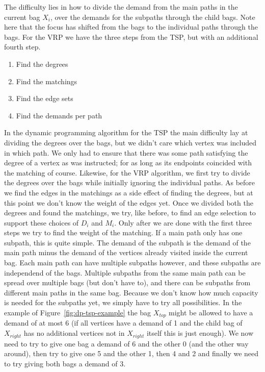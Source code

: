 \documentclass[12pt]{article}
\begin{document}
    The difficulty lies in how to divide the demand from the main paths in the current bag $X_i$,
    over the demands for the subpaths through the child bags. Note here that the focus has shifted
    from the bags to the individual paths through the bags. For the VRP we have the three steps from
    the TSP, but with an additional fourth step.
    \begin{enumerate}
        \item Find the degrees
        \item Find the matchings
        \item Find the edge sets
        \item Find the demands per path
    \end{enumerate}
    In the dynamic programming algorithm for the TSP the main difficulty lay at dividing the degrees
    over the bags, but we didn't care which vertex was included in which path. We only had to ensure
    that there was some path satisfying the degree of a vertex as was instructed; for as long as its
    endpoints coincided with the matching of course.
    Likewise, for the VRP algorithm, we first try to divide the degrees over the bags while initially
    ignoring the individual paths. As before we find the edges in the matchings as a side effect of
    finding the degrees, but at this point we don't know the weight of the edges yet. Once we
    divided both the degrees and found the matchings, we try, like before, to find an edge selection
    to support these choices of $D_i$ and $M_i$.
    Only after we are done with the first three steps we try to find the weight of the matching. If a
    main path only has one subpath, this is quite simple. The demand of the subpath is the demand of
    the main path minus the demand of the vertices already visited inside the current bag.
    Each main path can have multiple subpaths however, and these subpaths are independend of the
    bags. Multiple subpaths from the same main path can be spread over multiple bags (but don't have
    to), and there can be subpaths from different main paths in the same bag.
    Because we don't know how much capacity is needed for the subpaths yet, we simply have to try
    all possibilities. In the example of Figure~\ref{fig:dp-tsp-example} the bag $X_{top}$ might
    be allowed to have a demand of at most 6 (if all vertices have a demand of 1 and the child bag
    of $X_{right}$ has no additional vertices not in $X_{right}$ itself this is just enough). We now
    need to try to give one bag a demand of 6 and the other 0 (and the other way around), then try
    to give one 5 and the other 1, then 4 and 2 and finally we need to try giving both bags a demand
    of 3.
\end{document}
